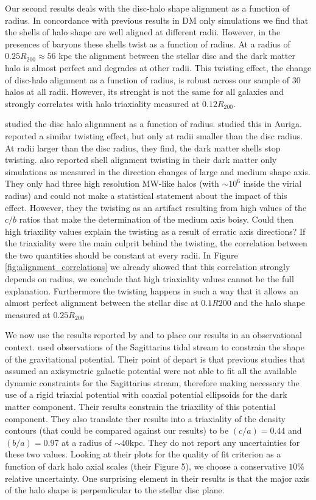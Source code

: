 \documentclass[usenatbib]{mnras}
\begin{document}
Our second results deals with the disc-halo shape alignment as a function of
radius. 
In concordance with previous results in DM only simulations we find
that the shells of halo shape are well aligned at different radii.
However, in the presences of baryons these shells twist as a function
of radius.
At a radius of $0.25R_{200}\approx 56$ kpc the alignment between the
stellar disc and the dark matter halo is almost perfect and degrades
at other radii. 
This twisting effect, the change of disc-halo alignment as
a function of radius, is robust across our sample of 30
halos at all radii.
However, its strenght is not the same for all galaxies and strongly
correlates with halo triaxiality measured at $0.12R_{200}$. 

\cite{Bailin05} studied the disc halo alignmnent as a function of
radius.
\cite{Gomez17} studied this in Auriga.
\cite{Debattista13} reported a similar twisting effect, but only at radii smaller
than the disc radius. 
At radii larger than the disc radius, they find, the dark matter
shells stop twisting. 
\cite{JingSuto02} also reported shell alignment twisting in their dark
matter only simulations as measured in the direction changes of large
and medium shape axis. 
They only had three high resolution MW-like halos (with
$\sim 10^{6}$ inside the virial radius) and could not make a
statistical statement about the impact of this effect.
However, they the twisting as an artifact resulting from high values of the
$c/b$ ratios that make the determination of the medium axis boisy.
Could then high triaxility values explain the twisting as a result of
erratic axis directions? 
If the triaxiality were the main culprit behind the twisting, the
correlation between the two quantities should be constant at every
radii.
In Figure \ref{fig:alignment_correlations} we already showed that this
correlation strongly depends on radius, we conclude that high
triaxiality values cannot be the full explanation.
Furthermore the twisting happens in such a way that it allows an
almost perfect alignment between the stellar disc at $0.1R{200}$ and
the halo shape measured at $0.25R_{200}$ 

We now use the results reported by \cite{LM10} and \cite{Bovy16}
to place our results in an observational context.
\cite{LM10} used observations of the Sagittarius tidal stream to
constrain the shape of the gravitational potential.
Their point of depart is that previous studies that assumed an
axisymetric galactic potential were not able to fit all the available
dynamic constraints for the Sagittarius stream, therefore making
necessary the use of a rigid triaxial potential with coaxial potential
ellipsoids for the dark matter component.  
Their results constrain the triaxility of this potential
component. 
They also translate ther results into a triaxiality of the density
contours (that could be compared against our results)
 to be $(c/a)=0.44$ and $(b/a)=0.97$ at a radius of $\sim 40$kpc. 
They do not report any uncertainties for these two values. 
Looking at their plots for the quality of fit criterion as a function
of dark halo axial scales (their Figure 5), we choose a conservative $10\%$
relative uncertainty.
One surprising element in their results is that  the major axis of the
halo shape is perpendicular to the stellar disc plane.  
\end{document}
